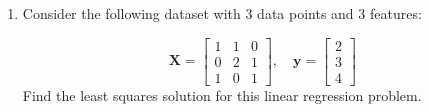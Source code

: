 \documentclass{article}
\begin{document}
\begin{enumerate}






\item Consider the following dataset with 3 data points and 3 features:

\[
\mathbf{X} = \begin{bmatrix}
1 & 1 & 0 \\
0 & 2 & 1 \\
1 & 0 & 1
\end{bmatrix},
\quad \mathbf{y} = \begin{bmatrix}
2 \\
3 \\
4
\end{bmatrix}
\]
Find the least squares solution for this linear regression problem.


\end{enumerate}
\end{document}
